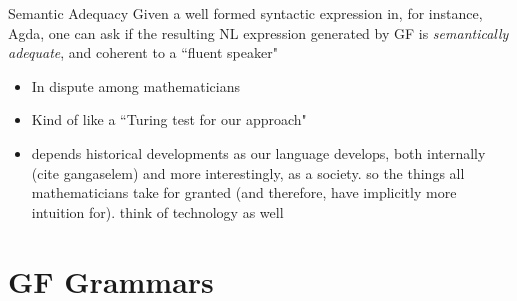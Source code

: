 \documentclass[10pt]{beamer}
\begin{document}
\begin{frame}

\begin{block}{Semantic Adequacy}
  Given a well formed syntactic expression in, for instance, Agda, one
can ask if the resulting NL expression generated by GF is
\emph{semantically adequate}, and coherent to a ``fluent speaker"

\end{block}

\begin{itemize}
  \item In dispute among mathematicians
  \item Kind of like a ``Turing test for our approach" %
  \item depends historical developments as our language develops, both
    internally (cite gangaselem) and more interestingly, as a society.
    so the
    things all mathematicians take for granted (and therefore, have implicitly
    more intuition for).  think of technology as well

\end{itemize}
  

\end{frame}

\section{GF Grammars}

\begin{frame}[fragile]
\centering
{}
\end{frame}
\end{document}
